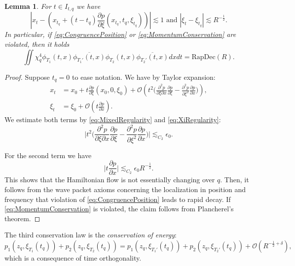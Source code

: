 \documentclass{amsart}
\newtheorem{lemma}[theorem]{Lemma}
\theoremstyle{definition}
\begin{document}
\begin{lemma}
For $t \in I_{t,q}$ we have
\begin{equation*}
|x_t - ( x_{t_q} + (t-t_q) \frac{\partial p}{\partial \xi}(x_{t_q},t_q,\xi_{t_q})) | \lesssim 1 \text{ and } |\xi_t - \xi_{t_q} | \lesssim R^{-\frac{1}{2}}.
\end{equation*}
In particular, if \eqref{eq:CongruencePosition} or \eqref{eq:MomentumConservation} are violated, then it holds
\begin{equation*}
\iint \chi_q^4 \phi_{T_1}(t,x) \overline{\phi_{T_1'}(t,x)} \phi_{T_2}(t,x) \overline{\phi_{T_2'}(t,x)} dx dt = \text{RapDec}(R).
\end{equation*}
\end{lemma}
\begin{proof}
Suppose $t_q = 0$ to ease notation. We have by Taylor expansion:
\begin{equation*}
\begin{split}
x_t &= x_0 + t \frac{\partial p}{\partial \xi}(x_0,0,\xi_0) + \mathcal{O}( t^2 \big( \frac{\partial^2 p}{\partial \xi \partial x} \frac{\partial p}{\partial \xi} - \frac{\partial^2 p}{\partial \xi^2} \frac{\partial p}{\partial x} \big) ), \\
\xi_t &= \xi_0 + \mathcal{O}(t \frac{\partial p}{\partial x}).
\end{split}
\end{equation*}
We estimate both terms by \eqref{eq:MixedRegularity} and \eqref{eq:XiRegularity}:
\begin{equation*}
\big| t^2 \big( \frac{\partial^2 p}{\partial \xi \partial x} \frac{\partial p}{\partial \xi} - \frac{\partial^2 p}{\partial \xi^2} \frac{\partial p}{\partial x} \big) \big| \lesssim_{C_2} \epsilon_0.
\end{equation*}

For the second term we have
\begin{equation*}
\big| t \frac{\partial p}{\partial x} \big| \lesssim_{C_2} \epsilon_0 R^{-\frac{1}{2}}.
\end{equation*}
This shows that the Hamiltonian flow is not essentially changing over $q$. Then, it follows from the wave packet axioms concerning the localization in position and frequency that violation of \eqref{eq:CongruencePosition} leads to rapid decay. If  \eqref{eq:MomentumConservation} is violated, the claim follows from Plancherel's theorem. 
\end{proof}

The third conservation law is the \emph{conservation of energy}: 
\begin{equation}
\label{eq:EnergyConservation}
p_1(z_q,\xi_{T_1}(t_q)) + p_2(z_q,\xi_{T_2}(t_q)) = p_1(z_q,\xi_{T_1'}(t_q)) + p_2(z_q,\xi_{T_2'}(t_q)) + \mathcal{O}(R^{-\frac{1}{2}+\delta}),
\end{equation}
which is a consequence of time orthogonality.
\end{document}
